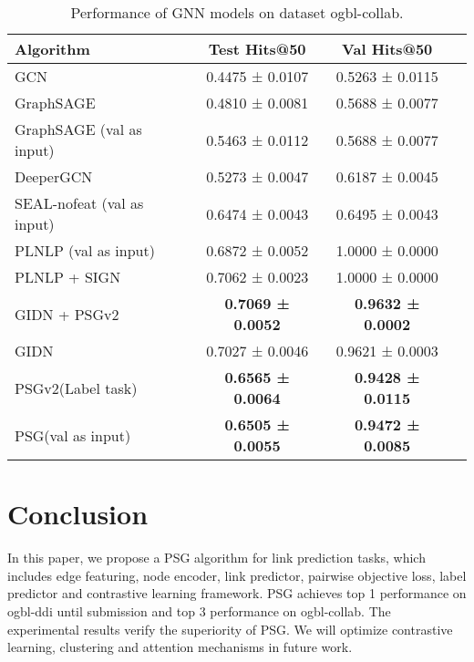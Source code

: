 \documentclass[sigconf]{acmart}
\begin{document}
\begin{table}[htbp]
    \centering
    \caption{Performance of GNN models on dataset ogbl-collab.}\label{tab_collab_result}
    \begin{tabular}{lccc}
    \hline
    Algorithm            & Test Hits@50  & Val Hits@50             \\ \hline
    GCN       & 0.4475 ± 0.0107         & 0.5263 ± 0.0115          \\
    GraphSAGE & 0.4810 ± 0.0081         & 0.5688 ± 0.0077        \\
    GraphSAGE (val as input) & 0.5463 ± 0.0112         & 0.5688 ± 0.0077        \\
    DeeperGCN   & 0.5273 ± 0.0047 & 0.6187 ± 0.0045 \\
    SEAL-nofeat (val as input)        & 0.6474 ± 0.0043          & 0.6495 ± 0.0043        \\
    PLNLP (val as input)   & 0.6872 ± 0.0052 & 1.0000 ± 0.0000 \\  \hline
    PLNLP + SIGN   & 0.7062 ± 0.0023 & 1.0000 ± 0.0000 \\
    GIDN + PSGv2   & \textbf{0.7069 ± 0.0052} & \textbf{0.9632 ± 0.0002} \\
    GIDN   & 0.7027 ± 0.0046 & 0.9621 ± 0.0003 \\
    PSGv2(Label task)   & \textbf{0.6565 ± 0.0064} & \textbf{0.9428 ± 0.0115} \\ 
    PSG(val as input)   & \textbf{0.6505 ± 0.0055} & \textbf{0.9472 ± 0.0085} \\ \hline
    \end{tabular}
\end{table}



\section{Conclusion}  \label{section_conclusion}
In this paper, we propose a PSG algorithm for link prediction tasks, which includes edge featuring, node encoder, link predictor,  pairwise objective loss, label predictor and contrastive learning framework. PSG achieves top 1 performance on ogbl-ddi until submission and top 3 performance on ogbl-collab. The experimental results verify the superiority of PSG. We will optimize contrastive learning, clustering and attention mechanisms in future work. 




\end{document}
